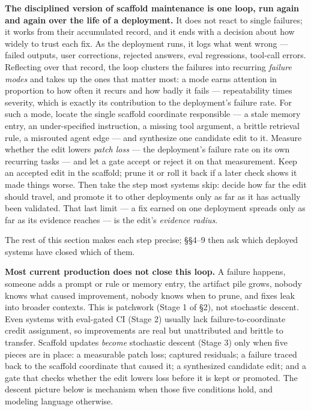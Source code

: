 \documentclass[
]{article}
\begin{document}
\textbf{The disciplined version of scaffold maintenance is one loop, run
again and again over the life of a deployment.} It does not react to
single failures; it works from their accumulated record, and it ends
with a decision about how widely to trust each fix. As the deployment
runs, it logs what went wrong --- failed outputs, user corrections,
rejected answers, eval regressions, tool-call errors. Reflecting over
that record, the loop clusters the failures into recurring \emph{failure
modes} and takes up the ones that matter most: a mode earns attention in
proportion to how often it recurs and how badly it fails ---
repeatability times severity, which is exactly its contribution to the
deployment's failure rate. For such a mode, locate the single scaffold
coordinate responsible --- a stale memory entry, an under-specified
instruction, a missing tool argument, a brittle retrieval rule, a
misrouted agent edge --- and synthesize one candidate edit to it.
Measure whether the edit lowers \emph{patch loss} --- the deployment's
failure rate on its own recurring tasks --- and let a gate accept or
reject it on that measurement. Keep an accepted edit in the scaffold;
prune it or roll it back if a later check shows it made things worse.
Then take the step most systems skip: decide how far the edit should
travel, and promote it to other deployments only as far as it has
actually been validated. That last limit --- a fix earned on one
deployment spreads only as far as its evidence reaches --- is the edit's
\emph{evidence radius}.

The rest of this section makes each step precise; §§4--9 then ask which
deployed systems have closed which of them.

\textbf{Most current production does not close this loop.} A failure
happens, someone adds a prompt or rule or memory entry, the artifact
pile grows, nobody knows what caused improvement, nobody knows when to
prune, and fixes leak into broader contexts. This is patchwork (Stage 1
of §2), not stochastic descent. Even systems with eval-gated CI (Stage
2) usually lack failure-to-coordinate credit assignment, so improvements
are real but unattributed and brittle to transfer. Scaffold updates
\emph{become} stochastic descent (Stage 3) only when five pieces are in
place: a measurable patch loss; captured residuals; a failure traced
back to the scaffold coordinate that caused it; a synthesized candidate
edit; and a gate that checks whether the edit lowers loss before it is
kept or promoted. The descent picture below is mechanism when those five
conditions hold, and modeling language otherwise.
\end{document}
